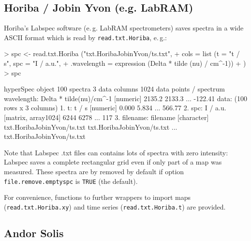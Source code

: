 \documentclass[english, a4paper, 10pt, headings=small, DIV11]{scrartcl}
\renewenvironment{Schunk}{\vspace{0pt}\begin{small}}{\end{small}\vspace{0pt}}
\newcommand{\Rcode}[2][]{\texorpdfstring{\nohyphens{#1\texttt{#2}}}{#2}}
\newcommand{\Rfunction}[2][]{\texorpdfstring{\nohyphens{#1\texttt{#2}}}{#2}}
\begin{document}
\subsection{Horiba / Jobin Yvon (e.g. LabRAM) }
\label{sec:read.txt.Horiba}

Horiba's Labspec software (e.\,g. LabRAM spectrometers) saves spectra in a wide ASCII format which is
read by \Rfunction{read.txt.Horiba}, e.\,g.:
\begin{Schunk}
\begin{Sinput}
> spc <- read.txt.Horiba ("txt.HoribaJobinYvon/ts.txt",
+                       cols = list (t = "t / s", spc = "I / a.u.",
+                         .wavelength = expression (Delta * tilde (nu) / cm^-1))
+                       )
> spc
\end{Sinput}
\begin{Soutput}
hyperSpec object
   100 spectra
   3 data columns
   1024 data points / spectrum
wavelength: Delta * tilde(nu)/cm^-1 [numeric] 2135.2 2133.3 ... -122.41 
data:  (100 rows x 3 columns)
   1. t: t / s [numeric] 0.000 5.834 ... 566.77 
   2. spc: I / a.u. [matrix, array1024] 6244 6278 ... 117 
   3. filename: filename [character] txt.HoribaJobinYvon/ts.txt txt.HoribaJobinYvon/ts.txt ... txt.HoribaJobinYvon/ts.txt 
\end{Soutput}
\end{Schunk}

Note that Labspec .txt files can contains lots of spectra with zero intensity: Labspec saves a
complete rectangular grid even if only part of a map was measured. These spectra are by removed
by default if option \Rcode{file.remove.emptyspc} is \Rcode{TRUE} (the default).

For convenience, functions to further wrappers to import maps (\Rfunction{read.txt.Horiba.xy}) and
time series (\Rfunction{read.txt.Horiba.t}) are provided.

\subsection{Andor Solis}
\label{sec:read.asc.Andor}
\end{document}
